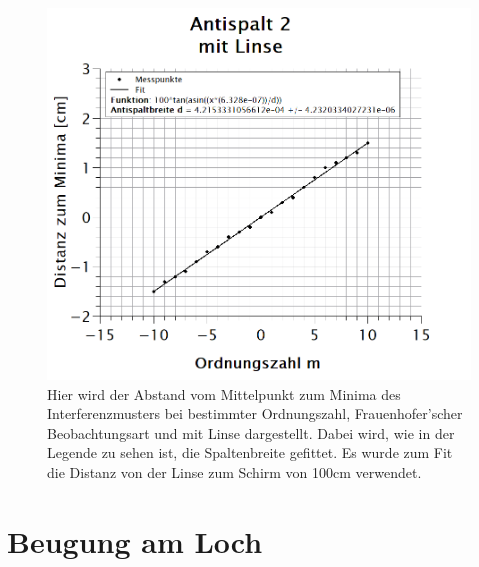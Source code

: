 \begin{figure}[h]
\centering
\includegraphics[width=\textwidth]{Bilder/antispalt2_mitLinse.png} 
\vspace*{-1cm}
\caption[Antispalt 2: mit Linse]{Hier wird der Abstand vom Mittelpunkt zum Minima des Interferenzmusters bei bestimmter Ordnungszahl, Frauenhofer'scher Beobachtungsart und mit Linse dargestellt. Dabei wird, wie in der Legende zu sehen ist, die Spaltenbreite gefittet. Es wurde zum Fit die Distanz von der Linse zum Schirm von 100cm verwendet.}
\label{fig:antispalt2_mitLinse}
\end{figure}
\newpage

\section{Beugung am Loch}
